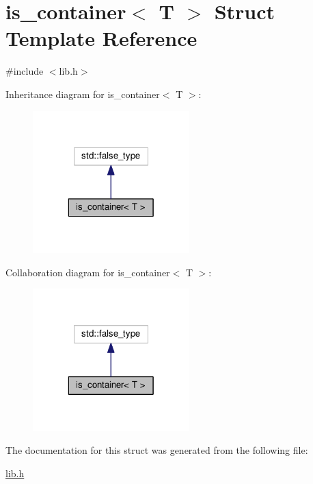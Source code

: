 \hypertarget{structis__container}{\section{is\-\_\-container$<$ T $>$ Struct Template Reference}
\label{structis__container}
}


{\ttfamily \#include $<$lib.\-h$>$}



Inheritance diagram for is\-\_\-container$<$ T $>$\-:
\nopagebreak
\begin{figure}[H]
\begin{center}
\leavevmode
\includegraphics[width=172pt]{structis__container__inherit__graph}
\end{center}
\end{figure}


Collaboration diagram for is\-\_\-container$<$ T $>$\-:
\nopagebreak
\begin{figure}[H]
\begin{center}
\leavevmode
\includegraphics[width=172pt]{structis__container__coll__graph}
\end{center}
\end{figure}


The documentation for this struct was generated from the following file\-:\begin{DoxyCompactItemize}
\item 
\hyperlink{lib_8h}{lib.\-h}\end{DoxyCompactItemize}
